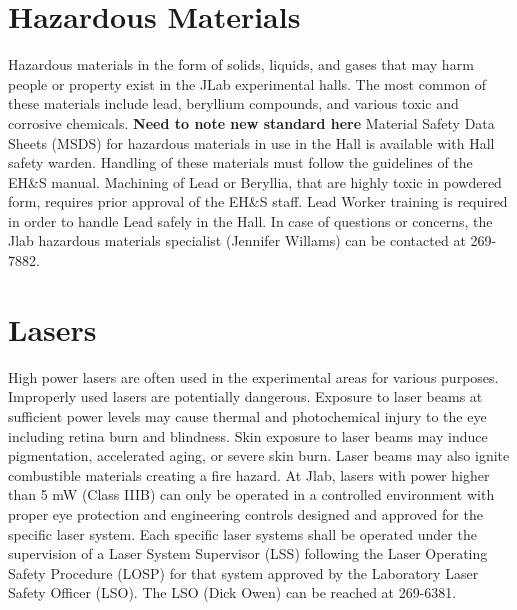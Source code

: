 \section{Hazardous Materials}

	Hazardous materials in the form of solids, liquids, and gases that may harm people 
or property exist in the JLab experimental halls. The most common of these materials include 
lead, beryllium compounds, and various toxic and corrosive chemicals. 
{\bf{Need to note new standard here}} Material Safety Data Sheets (MSDS) for hazardous materials 
in use in the Hall is available with Hall safety warden.  Handling of these materials 
must follow the guidelines of the EH\&S manual. Machining of Lead or Beryllia, that 
are highly toxic in powdered form, requires prior approval of the EH\&S staff. 
Lead Worker training is required in order to handle Lead safely in the Hall. 
In case of questions or concerns, the Jlab hazardous materials specialist (Jennifer Willams) can be contacted at 269-7882.

\section{Lasers}

	High power lasers are often used in the experimental areas for various purposes. Improperly 
used lasers are potentially dangerous. Exposure to laser beams at sufficient power levels 
may cause thermal and photochemical injury to the eye including retina burn and blindness. 
Skin exposure to laser beams may induce pigmentation, accelerated aging, or severe skin burn. 
Laser beams may also ignite combustible materials creating a fire hazard. At Jlab, lasers with power 
higher than 5 mW (Class IIIB) can only be operated in a controlled environment with proper eye protection 
and engineering controls designed and approved for the specific laser system. Each specific laser systems 
shall be operated under the supervision of a Laser System Supervisor (LSS) following the Laser 
Operating Safety Procedure (LOSP) for that system approved by the Laboratory Laser Safety Officer (LSO). 
The LSO (Dick Owen) can be reached at 269-6381.

